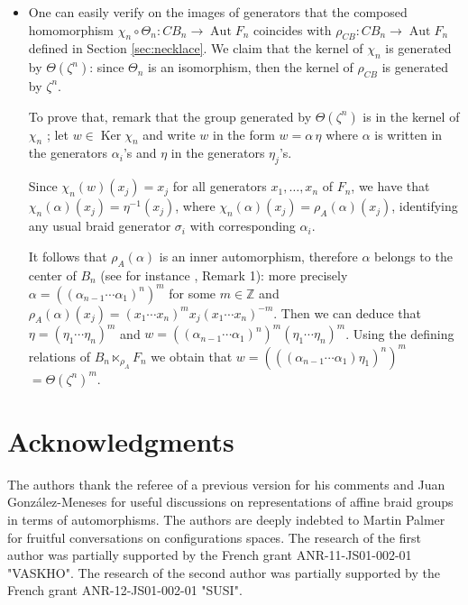 \documentclass[11pt]{amsart}
\begin{document}
\begin{itemize}
\item One can easily verify on the images of generators that the composed homomorphism $\chi_n \circ \Theta_n: CB_n  \to {\mathop{\mathrm{Aut}}\nolimits} F_n$
coincides with $\rho_{CB} : CB_n  \to {\mathop{\mathrm{Aut}}\nolimits} F_n$ defined in Section \ref{sec:necklace}.   We claim  that the kernel of $\chi_n$ 
is generated by $\Theta(\zeta^n)$: since $\Theta_n$ is an isomorphism, then the kernel of $\rho_{CB}$ is generated by $\zeta^n$.

To prove that,  remark that the group generated by $\Theta(\zeta^n)$ is in the kernel of $\chi_n$ ;  let $w \in {\mathop{\mathrm{Ker}}\nolimits} \chi_n$
and write $w$ in the form $w=\alpha  \, \eta$ where $\alpha$ is written in the generators $\alpha_i$'s  and $\eta$ in the generators
$\eta_j$'s.   

Since $\chi_n(w)(x_j)=x_j$ for all generators $x_1, \ldots, x_n$ of $F_n$,
we have that $\chi_n(\alpha)(x_j)=\eta^{-1}(x_j)$, where  $\chi_n(\alpha)(x_j)= \rho_A(\alpha)(x_j)$,
identifying any usual braid generator $\sigma_i$ with corresponding $\alpha_i$.

It follows that $\rho_A(\alpha)$ is an inner automorphism, therefore $\alpha$ belongs
to the center of $B_n$ (see for instance \cite{BB}, Remark 1): more precisely
$\alpha=((\alpha_{n-1} \cdots \alpha_1)^n)^m$ for some  $m \in {\mathbb{Z}}$ and 
$\rho_A(\alpha)(x_j)=(x_1 \cdots x_n)^m x_j (x_1 \cdots x_n)^{-m}$. Then we can deduce 
that $\eta=(\eta_1 \cdots \eta_n)^m$ and $w= ((\alpha_{n-1} \cdots \alpha_1)^n)^m (\eta_1 \cdots \eta_n)^m$.
Using the defining relations
of $B_n \ltimes_{\rho_A} F_n$ we obtain that $w=(((\alpha_{n-1} \cdots \alpha_1) \eta_1)^n)^m$
$=\Theta(\zeta^n)^m$.

  
  
\end{itemize}
 
\section*{Acknowledgments}

The authors thank the referee of a previous version for his comments and Juan Gonz\'alez-Meneses for useful
discussions on representations of affine braid groups in terms of automorphisms. 
The authors are deeply indebted to  Martin Palmer for fruitful conversations on configurations spaces.
The research of the first author was partially supported by the French grant ANR-11-JS01-002-01 "VASKHO".
The research of the second  author was partially supported by the French grant ANR-12-JS01-002-01 "SUSI".
\end{document}
